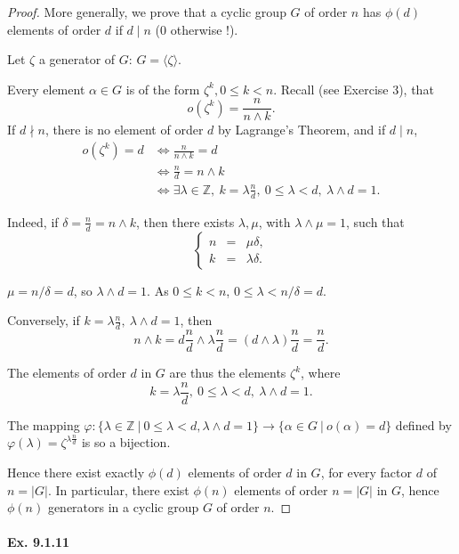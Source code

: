 \documentclass[11pt,a4paper]{article}
\newcommand{\Z}{\mathbb{Z}}
\begin{document}
\begin{proof}
More generally, we prove that a cyclic group $G$ of order $n$ has $\phi(d)$ elements of order $d$ if $d \mid n$ (0 otherwise !).

Let $\zeta$ a generator of $G$: $G = \langle \zeta \rangle$.

Every element $\alpha \in G$ is of the form $\zeta^k, 0 \leq k <n$. Recall (see Exercise 3), that 
$$o(\zeta^k) = \frac{n}{n\wedge k}.$$
If $d \nmid n$, there is no element of order $d$ by Lagrange's Theorem, and if $d \mid n$,
\begin{align*}
o(\zeta^k)  = d &\iff  \frac{n}{n\wedge k} = d\\
&\iff \frac{n}{d} = n \wedge k\\
&\iff\exists \lambda \in \Z,\  k = \lambda \frac{n}{d}, \ 0 \leq \lambda < d,\ \lambda \wedge d = 1.
\end{align*}

Indeed, if $\delta = \frac{n}{d} = n \wedge k$, then there exists $\lambda, \mu$, with $\lambda \wedge \mu = 1$, such that
$$
\left\{
\begin{array}{ccc}
 n &  = & \mu \delta,   \\
 k &   = & \lambda \delta.     
\end{array}
\right.
$$

$\mu = n/\delta = d$, so $\lambda \wedge d = 1$. As $0\leq k < n$, $0 \leq \lambda < n/\delta = d$.

Conversely, if $ k = \lambda \frac{n}{d}, \ \lambda \wedge d = 1$, then $$n\wedge k = d\frac{n}{d} \wedge\lambda \frac{n}{d} =  (d \wedge \lambda) \frac{n}{d}=  \frac{n}{d}.$$

The elements of order $d$ in $G$ are thus the elements $\zeta^k$, where $$k = \lambda \frac{n}{d}, \ 0 \leq \lambda < d,\ \lambda \wedge d = 1.$$

The mapping  $\varphi : \{\lambda \in \Z\ \vert \  0\leq \lambda <d, \lambda \wedge d = 1\} \to \{\alpha \in G \ \vert \ o(\alpha)= d\}$ 
defined by $\varphi(\lambda) = \zeta^{\lambda \frac{n}{d}}$ is so a bijection. 

Hence there exist exactly $\phi(d)$ elements of order $d$ in $G$, for every factor $d$ of $n = \vert G \vert$. In particular, there exist $\phi(n)$ elements of order $n = |G|$ in $G$, hence $\phi(n)$ generators in a cyclic group $G$ of order $n$.
\end{proof}

\paragraph{Ex. 9.1.11}
\end{document}
